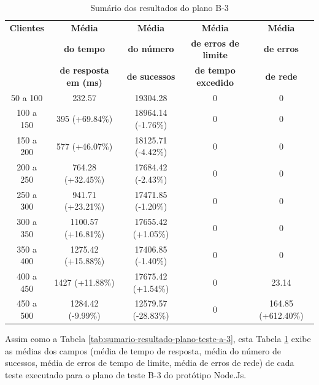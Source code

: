   \begin{table}[H]
    \centering
    \footnotesize
    \setlength{\abovecaptionskip}{0pt}
    \setlength{\belowcaptionskip}{0pt}
    \caption[Sumário dos resultados do plano B-3]{Sumário dos resultados do plano B-3}
    \label{tab:sumario-resultado-plano-teste-b-3}
    \begin{tabular}{c|c|c|c|c}
      \hline \hline
      \textbf{Clientes} & \textbf{Média} &	\textbf{Média} & \textbf{Média} & \textbf{Média}  \\
      {}		& \textbf{do tempo} &   \textbf{do número } & \textbf{de erros de limite} & \textbf{de erros}  \\
      {}		& \textbf{de resposta em (ms) } &\textbf{de sucessos } & \textbf{de tempo excedido} & \textbf{de rede} \\
      \hline \hline
      50 a 100 &		232.57  &			19304.28 &	 		0 &			0 \\
      100 a 150&		395 (+69.84\%)&			18964.14 (-1.76\%)&		0 &			0 \\
      150 a 200&		577 (+46.07\%)&			18125.71 (-4.42\%)& 		0 &			0 \\
      200 a 250&		764.28 (+32.45\%)&		17684.42 (-2.43\%)& 		0 &			0 \\
      250 a 300&		941.71 (+23.21\%)&		17471.85 (-1.20\%)& 		0 &			0 \\
      300 a 350&		1100.57 (+16.81\%)&		17655.42 (+1.05\%)& 		0 &			0 \\
      350 a 400&		1275.42 (+15.88\%)&		17406.85 (-1.40\%)& 		0 &			0 \\
      400 a 450&		1427 (+11.88\%)&		17675.42 (+1.54\%)& 		0 &			23.14 \\
      450 a 500&		1284.42 (-9.99\%)&		12579.57 (-28.83\%)& 		0 &			164.85 (+612.40\%)\\
      \hline \hline
    \end{tabular}
  \end{table}

  Assim como a Tabela \ref{tab:sumario-resultado-plano-teste-a-3}, esta Tabela \ref{tab:sumario-resultado-plano-teste-b-3} exibe as médias
  dos campos (média de tempo de resposta, média do número de sucessos, média de erros de tempo de limite, média de erros de rede)
  de cada teste executado para o plano de teste B-3 do protótipo Node.Js.

